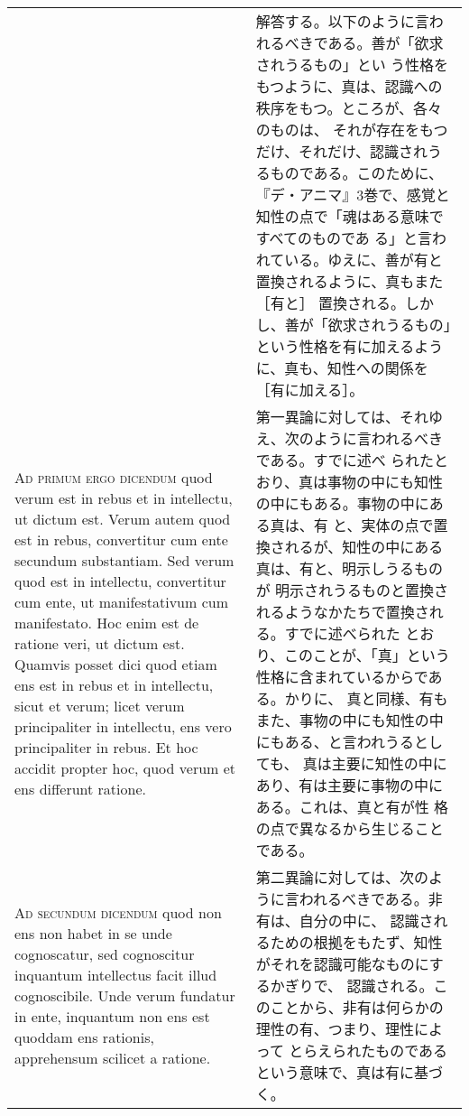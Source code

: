 \documentclass[10pt]{jsarticle} %
\begin{document}
\begin{longtable}{p{21em}p{21em}}
&

解答する。以下のように言われるべきである。善が「欲求されうるもの」とい
う性格をもつように、真は、認識への秩序をもつ。ところが、各々のものは、
それが存在をもつだけ、それだけ、認識されうるものである。このために、
『デ・アニマ』3巻で、感覚と知性の点で「魂はある意味ですべてのものであ
る」と言われている。ゆえに、善が有と置換されるように、真もまた［有と］
置換される。しかし、善が「欲求されうるもの」という性格を有に加えるよう
に、真も、知性への関係を［有に加える］。

\\

{\scshape Ad primum ergo dicendum} quod verum est in rebus et in
intellectu, ut dictum est. Verum autem quod est in rebus, convertitur
cum ente secundum substantiam. Sed verum quod est in intellectu,
convertitur cum ente, ut manifestativum cum manifestato. Hoc enim est
de ratione veri, ut dictum est. Quamvis posset dici quod etiam ens est
in rebus et in intellectu, sicut et verum; licet verum principaliter
in intellectu, ens vero principaliter in rebus. Et hoc accidit propter
hoc, quod verum et ens differunt ratione.


&

第一異論に対しては、それゆえ、次のように言われるべきである。すでに述べ
られたとおり、真は事物の中にも知性の中にもある。事物の中にある真は、有
と、実体の点で置換されるが、知性の中にある真は、有と、明示しうるものが
明示されうるものと置換されるようなかたちで置換される。すでに述べられた
とおり、このことが、「真」という性格に含まれているからである。かりに、
真と同様、有もまた、事物の中にも知性の中にもある、と言われうるとしても、
真は主要に知性の中にあり、有は主要に事物の中にある。これは、真と有が性
格の点で異なるから生じることである。


\\


{\scshape Ad secundum dicendum} quod non ens non habet in se unde
cognoscatur, sed cognoscitur inquantum intellectus facit illud
cognoscibile. Unde verum fundatur in ente, inquantum non ens est
quoddam ens rationis, apprehensum scilicet a ratione.


&

第二異論に対しては、次のように言われるべきである。非有は、自分の中に、
認識されるための根拠をもたず、知性がそれを認識可能なものにするかぎりで、
認識される。このことから、非有は何らかの理性の有、つまり、理性によって
とらえられたものであるという意味で、真は有に基づく。

\\


\end{longtable}
\end{document}
